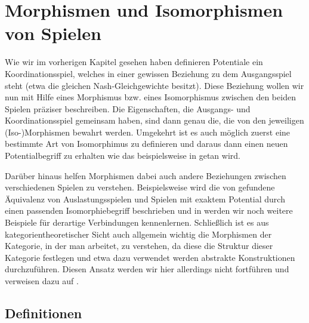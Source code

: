 \section[Morphismen]{Morphismen und Isomorphismen von Spielen}\label{sec:Morphismen}

Wie wir im vorherigen Kapitel gesehen haben definieren Potentiale ein Koordinationsspiel, welches in einer \glqq gewissen Beziehung\grqq{} zu dem Ausgangsspiel steht (etwa die gleichen Nash-Gleichgewichte besitzt). Diese Beziehung wollen wir nun mit Hilfe eines Morphismus bzw. eines Isomorphismus zwischen den beiden Spielen präziser beschreiben. Die Eigenschaften, die Ausgangs- und Koordinationsspiel gemeinsam haben, sind dann genau die, die von den jeweiligen (Iso-)Morphismen bewahrt werden. Umgekehrt ist es auch möglich zuerst eine bestimmte Art von Isomorphimus zu definieren und daraus dann einen neuen Potentialbegriff zu erhalten wie das beispielsweise in \cite[Definitionen 5/6]{BestRespEq} getan wird.

Darüber hinaus helfen Morphismen dabei auch andere Beziehungen zwischen verschiedenen Spielen zu verstehen. Beispielsweise wird die von \citeauthor{MonShap} gefundene Äquivalenz von Auslastungsspielen und Spielen mit exaktem Potential durch einen passenden Isomorphiebegriff beschrieben und in  werden wir noch weitere Beispiele für derartige Verbindungen kennenlernen. Schließlich ist es aus kategorientheoretischer Sicht auch allgemein wichtig die Morphismen der Kategorie, in der man arbeitet, zu verstehen, da diese die Struktur dieser Kategorie festlegen und etwa dazu verwendet werden abstrakte Konstruktionen durchzuführen. Diesen Ansatz werden wir hier allerdings nicht fortführen und verweisen dazu auf \cite{LapGameCat}.

\subsection{Definitionen}

